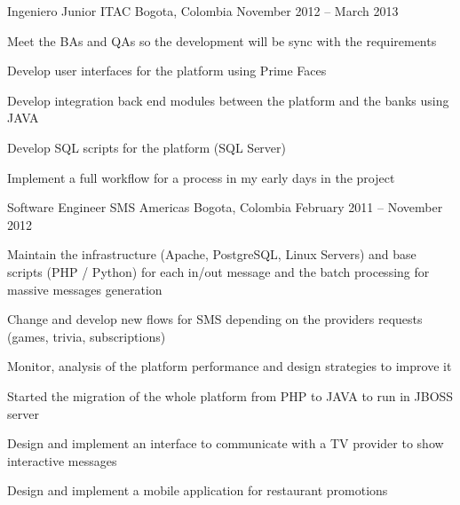 \begin{cventries}
  \cventry
    {Ingeniero Junior} %
    {ITAC} %
    {Bogota, Colombia} %
    {November 2012 – March 2013} %
    {
      \begin{cvitems} %
        \item {Meet the BAs and QAs so the development will be sync with the requirements}
        \item {Develop user interfaces for the platform using Prime Faces}
        \item {Develop integration back end modules between the platform and the banks using JAVA}
        \item {Develop SQL scripts for the platform (SQL Server)}
        \item {Implement a full workflow for a process in my early days in the project}
      \end{cvitems}
    }

  \cventry
    {Software Engineer} %
    {SMS Americas} %
    {Bogota, Colombia} %
    {February 2011 – November 2012 } %
    {
      \begin{cvitems} %
        \item {Maintain the infrastructure (Apache, PostgreSQL, Linux Servers) and base scripts (PHP / Python) for each in/out message and the batch processing for massive messages generation}
        \item {Change and develop new flows for SMS depending on the providers requests (games, trivia, subscriptions)}
        \item {Monitor, analysis of the platform performance and design strategies to improve it}
        \item {Started the migration of the whole platform from PHP to JAVA to run in JBOSS server}
        \item {Design and implement an interface to communicate with a TV provider to show interactive messages}
        \item {Design and implement a mobile application for restaurant promotions}
      \end{cvitems}
    }
\end{cventries}

